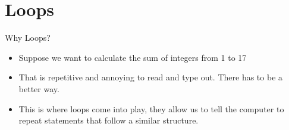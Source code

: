 {}\documentclass[letterpaper,
compress,
xcolor=x11names,
]{beamer}
\begin{document}
\section{Loops}

\begin{frame}{Why Loops?}
	\footnotesize
	\begin{itemize}
		\item Suppose we want to calculate the sum of integers from 1 to 17
		\begin{center}
		\end{center}
		\item<2-> That is repetitive and annoying to read and type out. There has to be a better way.
		\item<3-> This is where loops come into play, they allow us to tell the computer to repeat statements that follow a similar structure.
	\end{itemize}
\end{frame}

\end{document}
